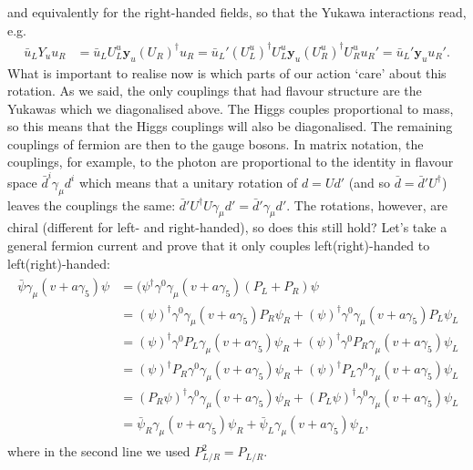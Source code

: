 \documentclass[a4paper, 11pt, normalem]{report}
\begin{document}
and equivalently for the right-handed fields, so that the Yukawa interactions read, e.g.
\begin{align}
    \bar{u}_LY_uu_R &= \bar{u}_LU_L^u\mathbf{y}_u(U_R)^\dagger u_R = \bar{u}_L'(U_L^u)^\dagger U_L^u\mathbf{y}_u(U_R^u)^\dagger U_R^uu_R' = \bar{u}_L'\mathbf{y}_uu_R'.
\end{align}
What is important to realise now is which parts of our action `care' about this rotation.
As we said, the only couplings that had flavour structure are the Yukawas which we diagonalised above.
The Higgs couples proportional to mass, so this means that the Higgs couplings will also be diagonalised.
The remaining couplings of fermion are then to the gauge bosons.
In matrix notation, the couplings, for example, to the photon are proportional to the identity in flavour space $\bar{d}^i\gamma_\mu d^i$ which means that a unitary rotation of $d=Ud'$ (and so $\bar{d}=\bar{d}'U^\dagger$) leaves the couplings the same: $\bar{d}'U^\dagger U\gamma_\mu d'=\bar{d}'\gamma_\mu d'$.
The rotations, however, are chiral (different for left- and right-handed), so does this still hold?
Let's take a general fermion current and prove that it only couples left(right)-handed to left(right)-handed:
\begin{align}
    \begin{split}
        \bar{\psi}\gamma_\mu(v+a\gamma_5)\psi &= (\psi^\dagger\gamma^0\gamma_\mu(v+a\gamma_5)(P_L+P_R)\psi \\
                                              &= (\psi)^\dagger\gamma^0\gamma_\mu(v+a\gamma_5)P_R\psi_R + (\psi)^\dagger\gamma^0\gamma_\mu(v+a\gamma_5)P_L\psi_L \\
                                              &= (\psi)^\dagger\gamma^0P_L\gamma_\mu(v+a\gamma_5)\psi_R + (\psi)^\dagger\gamma^0P_R\gamma_\mu(v+a\gamma_5)\psi_L \\
                                              &= (\psi)^\dagger P_R\gamma^0\gamma_\mu(v+a\gamma_5)\psi_R + (\psi)^\dagger P_L\gamma^0\gamma_\mu(v+a\gamma_5)\psi_L \\
                                              &= (P_R\psi)^\dagger\gamma^0\gamma_\mu(v+a\gamma_5)\psi_R + (P_L\psi)^\dagger\gamma^0\gamma_\mu(v+a\gamma_5)\psi_L \\
                                              &= \bar{\psi}_R\gamma_\mu(v+a\gamma_5)\psi_R + \bar{\psi}_L\gamma_\mu(v+a\gamma_5)\psi_L,
    \end{split}
\end{align}
where in the second line we used $P_{L/R}^2=P_{L/R}$.
\end{document}
